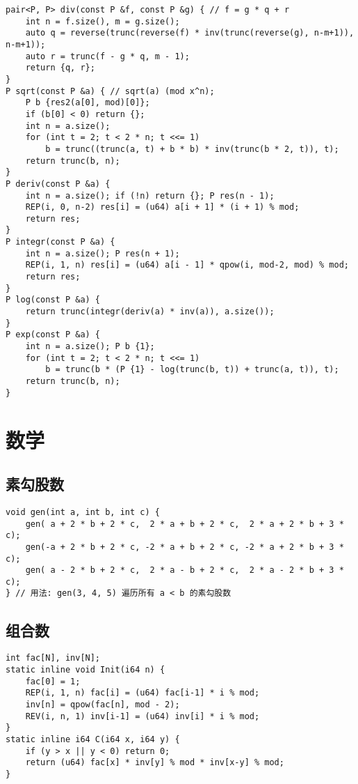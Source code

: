 \documentclass[a4paper,landscape,twocolumn]{ctexart}
\begin{document}
\begin{lstlisting}[]
pair<P, P> div(const P &f, const P &g) { // f = g * q + r
	int n = f.size(), m = g.size();
	auto q = reverse(trunc(reverse(f) * inv(trunc(reverse(g), n-m+1)), n-m+1));
	auto r = trunc(f - g * q, m - 1);
	return {q, r};
}
P sqrt(const P &a) { // sqrt(a) (mod x^n);
	P b {res2(a[0], mod)[0]};
	if (b[0] < 0) return {};
	int n = a.size();
	for (int t = 2; t < 2 * n; t <<= 1)
		b = trunc((trunc(a, t) + b * b) * inv(trunc(b * 2, t)), t);
	return trunc(b, n);
}
P deriv(const P &a) {
	int n = a.size(); if (!n) return {}; P res(n - 1);
	REP(i, 0, n-2) res[i] = (u64) a[i + 1] * (i + 1) % mod;
	return res;
}
P integr(const P &a) {
	int n = a.size(); P res(n + 1);
	REP(i, 1, n) res[i] = (u64) a[i - 1] * qpow(i, mod-2, mod) % mod;
	return res;
}
P log(const P &a) {
	return trunc(integr(deriv(a) * inv(a)), a.size());
}
P exp(const P &a) {
	int n = a.size(); P b {1};
	for (int t = 2; t < 2 * n; t <<= 1)
		b = trunc(b * (P {1} - log(trunc(b, t)) + trunc(a, t)), t);
	return trunc(b, n);
}
\end{lstlisting}

\section{数学}

\subsection{素勾股数}

\begin{lstlisting}
void gen(int a, int b, int c) {
    gen( a + 2 * b + 2 * c,  2 * a + b + 2 * c,  2 * a + 2 * b + 3 * c);
    gen(-a + 2 * b + 2 * c, -2 * a + b + 2 * c, -2 * a + 2 * b + 3 * c);
    gen( a - 2 * b + 2 * c,  2 * a - b + 2 * c,  2 * a - 2 * b + 3 * c);
} // 用法: gen(3, 4, 5) 遍历所有 a < b 的素勾股数
\end{lstlisting}

\subsection{组合数}

\begin{lstlisting}
int fac[N], inv[N];
static inline void Init(i64 n) {
	fac[0] = 1;
	REP(i, 1, n) fac[i] = (u64) fac[i-1] * i % mod;
	inv[n] = qpow(fac[n], mod - 2);
	REV(i, n, 1) inv[i-1] = (u64) inv[i] * i % mod;
}
static inline i64 C(i64 x, i64 y) {
	if (y > x || y < 0) return 0;
	return (u64) fac[x] * inv[y] % mod * inv[x-y] % mod;
}
\end{lstlisting}
\end{document}
